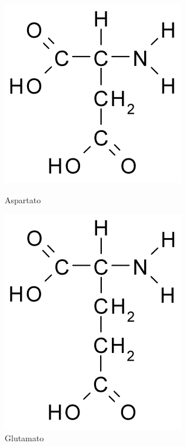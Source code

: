 \begin{figure}[H]
	\begin{center}
		\begin{minipage}{0.45\linewidth}
			\centering   
			\includegraphics[width=0.5\linewidth]{secProteins/figures/asparticacid.png}	
			\caption{Aspartato}
			\label{fig:asparticacid}
		\end{minipage}
		\begin{minipage}{0.45\linewidth}
			\centering   
			\includegraphics[width=0.45\linewidth]{secProteins/figures/glutamicacid.png}
			\caption{Glutamato}
			\label{fig:glutamicacid}
		\end{minipage}
	\end{center}
\end{figure}
